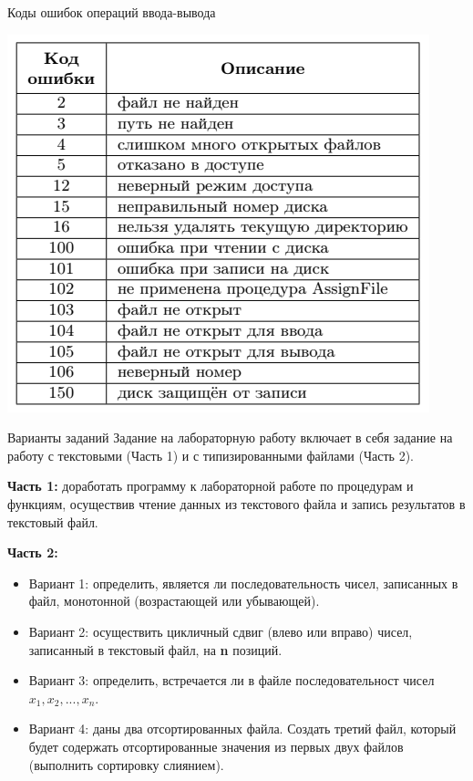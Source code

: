 \documentclass{beamer}
\begin{document}
\begin{frame}
\begin{block}{Коды ошибок операций ввода-вывода}
\begin{center}
\includegraphics[scale=0.6]{images/ioresult.png}
\end{center}
\end{block}
\end{frame}

\begin{frame}{Варианты заданий}
Задание на лабораторную работу включает в себя задание на работу с текстовыми (Часть 1) и с типизированными файлами (Часть 2).

\textbf{Часть 1:} доработать программу к лабораторной работе по процедурам и функциям, осуществив
чтение данных из текстового файла и запись результатов в текстовый файл.

\textbf{Часть 2:}
\begin{itemize}
\item Вариант 1: определить, является ли последовательность чисел, записанных в файл, монотонной (возрастающей или убывающей).
\item Вариант 2: осуществить цикличный сдвиг (влево или вправо) чисел, записанный в текстовый файл, на \textbf{n} позиций.
\item Вариант 3: определить, встречается ли в файле последовательност чисел $x_1, x_2, ..., x_n$.
\item Вариант 4: даны два отсортированных файла. Создать третий файл, который будет содержать отсортированные значения из первых двух файлов (выполнить сортировку слиянием).
\end{itemize}
\end{frame}
\end{document}
